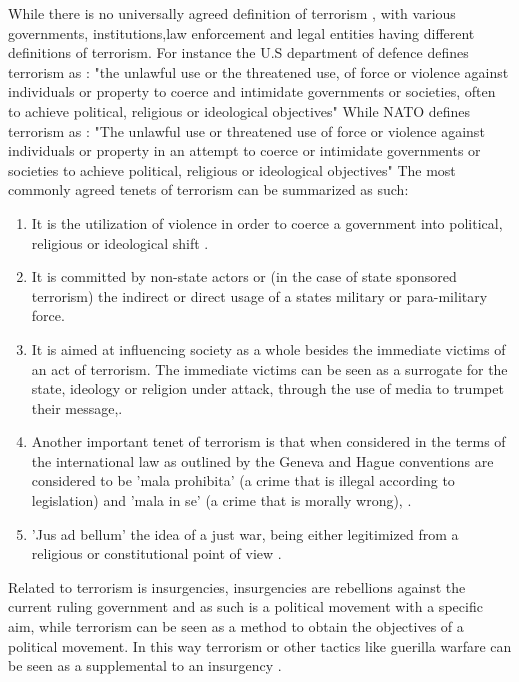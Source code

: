 \documentclass[11pt,twocolumn]{article}
\begin{document}
While there is no universally agreed definition of terrorism \citep{ruby2002definition}, with various governments, institutions,law enforcement and legal entities having different definitions of terrorism. For instance the U.S department of defence defines terrorism as \citep{pub1998pub}:
"the unlawful use or the threatened use, of force or violence against individuals or property to coerce and intimidate governments or societies, often to achieve political, religious or ideological objectives"
While NATO defines terrorism as \citep{chase2013defining}:
"The unlawful use or threatened use of force or violence against individuals or property in an attempt to coerce or intimidate governments or societies to achieve political, religious or ideological objectives"
The most commonly agreed tenets of terrorism can be summarized as such:
\begin{enumerate}
\item It is the utilization of violence in order to coerce a government into political, religious or ideological shift \citep{chase2013defining}.
\item It is committed by non-state actors or (in the case of state sponsored terrorism) the indirect or direct usage of a states military or para-military force.
\item It is aimed at influencing society as a whole besides the immediate victims of an act of terrorism. The immediate victims can be seen as a surrogate for the state, ideology or religion under attack, through the use of media to trumpet their message,\citep{el2014terrorist}.
\item Another important tenet of terrorism is that when considered in the terms of the  international law  as outlined by the Geneva and Hague conventions are considered to be 'mala prohibita' (a crime that is illegal according to legislation) and 'mala in se' (a crime that is morally wrong), \citep{ganor2002defining}.
\item 'Jus ad bellum' the idea of a just war, being either legitimized from a  religious or constitutional point of view \citep{kennedy1999one}. 
\end{enumerate}
Related to terrorism is insurgencies, insurgencies are rebellions against the current ruling government and as such is a political movement with a specific aim, while terrorism can be seen as a method to obtain the objectives of a political movement. In this way terrorism or other tactics like guerilla warfare can be seen as a supplemental to an insurgency \citep{merari1993terrorism}.
\end{document}
